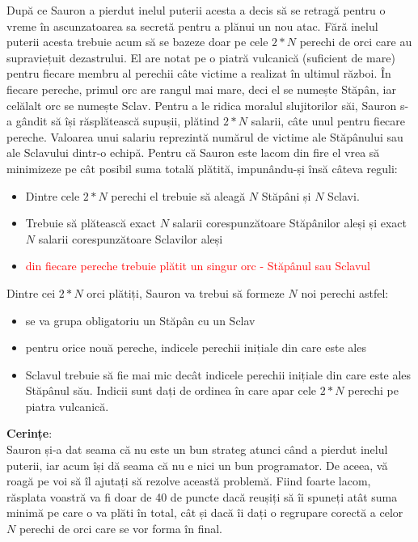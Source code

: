 \documentclass[a4paper,5pt]{article}
\begin{document}
După ce Sauron a pierdut inelul puterii acesta a decis să se retragă pentru o 
vreme în ascunzatoarea sa secretă pentru a plănui un nou atac. 
Fără inelul puterii acesta trebuie acum să se bazeze doar pe cele 
$2*N$ perechi de orci care au supraviețuit dezastrului. 
El are notat pe o piatră vulcanică (suficient de mare) pentru fiecare membru 
al perechii câte victime a realizat în ultimul război. 
În fiecare pereche, primul orc are rangul mai mare, deci el se numește Stăpân, iar
celălalt orc se numește Sclav.
Pentru a le ridica moralul slujitorilor săi, Sauron s-a gândit să își răsplătească
supușii, plătind $2*N$ salarii, câte unul pentru fiecare pereche.
Valoarea unui salariu reprezintă numărul de victime ale Stăpânului sau ale Sclavului 
dintr-o echipă.
Pentru că Sauron este lacom din fire el vrea să minimizeze pe cât posibil 
suma totală plătită, impunându-și însă câteva reguli:
\begin{itemize}
\item Dintre cele $2*N$ perechi el trebuie să aleagă $N$ Stăpâni și $N$ Sclavi.
\item Trebuie să plătească exact $N$ salarii corespunzătoare Stăpânilor aleși și exact 
$N$ salarii corespunzătoare Sclavilor aleși
\item \textcolor{red}{din fiecare pereche trebuie plătit un singur orc - Stăpânul sau Sclavul}
\end{itemize}
Dintre cei $2*N$ orci plătiți, Sauron va trebui să formeze $N$ noi perechi astfel:
\begin{itemize}
\item se va grupa obligatoriu un Stăpân cu un Sclav
\item pentru orice nouă pereche, indicele perechii inițiale din care este ales
\item Sclavul trebuie să fie mai mic decât indicele perechii inițiale din care este ales
Stăpânul său. Indicii sunt dați de ordinea în care apar cele $2*N$ perechi pe piatra vulcanică.
\end{itemize}

\textbf{Cerințe}: \\
Sauron și-a dat seama că nu este un bun strateg atunci când a pierdut inelul 
puterii, iar acum își dă seama că nu e nici un bun programator. De aceea, vă 
roagă pe voi să îl ajutați să rezolve această problemă. Fiind foarte lacom, 
răsplata voastră va fi  doar de 40 de puncte  dacă reușiți să îi spuneți atât suma
minimă pe care o va plăti în total, cât și dacă îi dați o regrupare corectă a 
celor $N$ perechi de orci care se vor forma în final.
\end{document}
